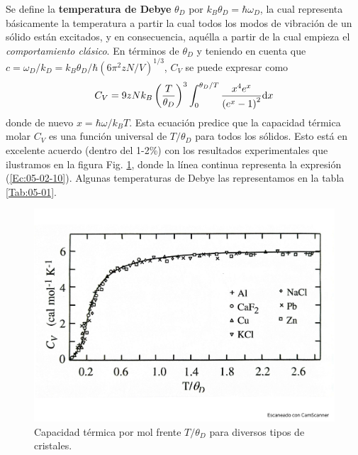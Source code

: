 \begin{enumerate}
    Se define la \textbf{temperatura de Debye} $\theta_D$ por $k_B\theta_D=\hbar \omega_D$, la cual representa básicamente la temperatura a partir la cual todos los modos de vibración de un sólido están excitados, y en consecuencia, aquélla a partir de la cual empieza el \textit{comportamiento clásico}. En términos de $\theta_D$ y teniendo en cuenta que $c=\omega_D /k_D = k_B \theta_D / \hbar (6 \pi^2 z N/V)^{1/3}$, $C_V$ se puede expresar como
    \begin{equation}
        C_V = 9zNk_B \left( \frac{T}{\theta_D} \right)^3 \int_0^{\theta_D/T} \frac{x^4 e^x}{\left( e^x-1 \right)^2}\mathrm{d} x \label{Ec:05-02-10}
    \end{equation}
    donde de nuevo $x=\hbar \omega / k_B T$. Esta ecuación predice que la capacidad térmica molar $C_V$ es una función universal de $T/\theta_D$ para todos los sólidos. Esto está en excelente acuerdo (dentro del 1-2\%) con los resultados experimentales que ilustramos en la figura Fig. \ref{Fig:05-04}, donde la línea continua representa la expresión (\ref{Ec:05-02-10}). Algunas temperaturas de Debye las representamos en la tabla \ref{Tab:05-01}.
\end{enumerate}

\begin{figure}[h!] \centering
    \includegraphics[scale=0.35]{Cuerpo/Ch_05/Fotos libro 4.pdf}
    \caption{Capacidad térmica por mol frente $T/\theta_D$ para diversos tipos de cristales.}
    \label{Fig:05-04}
\end{figure}    

